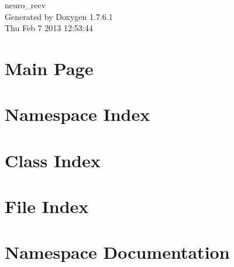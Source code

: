 \documentclass[a4paper]{book}
\begin{document}
\begin{titlepage}
\vspace*{7cm}
\begin{center}
{\Large neuro\-\_\-recv }\\
\vspace*{1cm}
{\large \-Generated by Doxygen 1.7.6.1}\\
\vspace*{0.5cm}
{\small Thu Feb 7 2013 12:53:44}\\
\end{center}
\end{titlepage}
\clearemptydoublepage
{}
\tableofcontents
\clearemptydoublepage
{}
\chapter{\-Main \-Page}
\label{index}
\chapter{\-Namespace \-Index}

\chapter{\-Class \-Index}

\chapter{\-File \-Index}

\chapter{\-Namespace \-Documentation}










\end{document}
